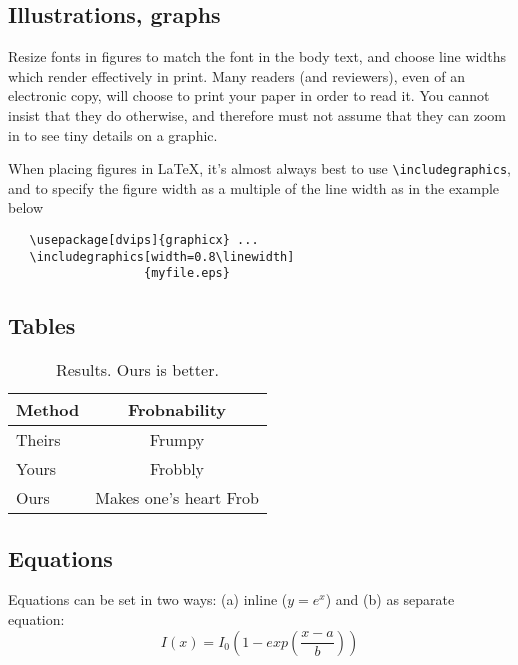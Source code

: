 \documentclass{article}
\begin{document}
\subsection{Illustrations, graphs}

Resize fonts in figures to match the font in the body text, and choose line 
widths which render effectively in print.  Many readers (and reviewers), 
even of an electronic copy, will choose to print your paper in order to read it.  You cannot
insist that they do otherwise, and therefore must not assume that they can
zoom in to see tiny details on a graphic.

When placing figures in \LaTeX, it's almost always best to use
\verb+\includegraphics+, and to specify the  figure width as a multiple of
the line width as in the example below

{\small\begin{verbatim}
   \usepackage[dvips]{graphicx} ...
   \includegraphics[width=0.8\linewidth]
                   {myfile.eps}
\end{verbatim}
}


\subsection{Tables}

\begin{table}[h]
\begin{center}
\begin{tabular}{lc}
\hline
Method & Frobnability \\
\hline\hline
Theirs & Frumpy \\
Yours & Frobbly \\
Ours & Makes one's heart Frob\\
\hline
\end{tabular}
\end{center}
\caption{Results.   Ours is better.}
\end{table}


\subsection{Equations}

Equations can be set in two ways: (a) inline ($y = e^x$) and (b) as separate equation:
\begin{equation} 
I(x) = I_{0}(1-exp(\frac{x-a}{b}))
\end{equation}
    
\end{document}
